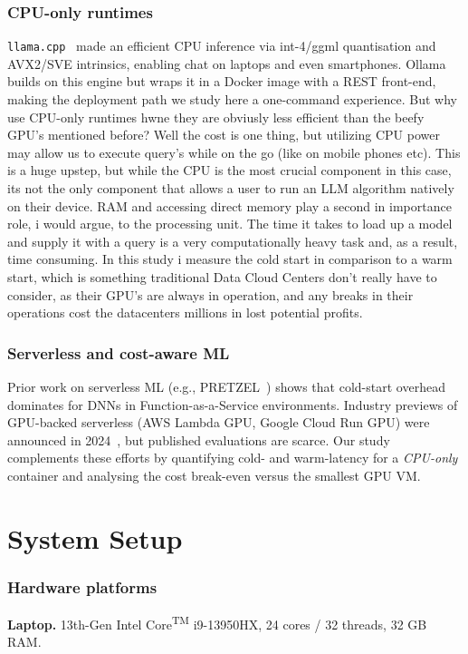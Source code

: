 \documentclass[conference]{IEEEtran}
\begin{document}
\subsubsection*{CPU-only runtimes}
\texttt{llama.cpp}~\cite{llamacpp} made an efficient CPU inference via int-4/ggml quantisation and AVX2/SVE intrinsics, enabling chat on laptops and even smartphones.
Ollama builds on this engine but wraps it in a Docker image with a REST front-end, making the deployment path we study here a one-command experience. But why use CPU-only runtimes hwne they are obviusly less efficient than the beefy GPU's mentioned before? Well the cost is one thing, but utilizing CPU power may allow us to execute query's while on the go (like on mobile phones etc). This is a huge upstep, but while the CPU is the most crucial component in this case, its not the only component that allows a user to run an LLM algorithm natively on their device. RAM and accessing direct memory play a second in importance role, i would argue, to the processing unit. The time it takes to load up a model and supply it with a query is a very computationally heavy task and, as a result, time consuming. In this study i measure the cold start in comparison to a warm start, which is something traditional Data Cloud Centers don't really have to consider, as their GPU's are always in operation, and any breaks in their operations cost the datacenters millions in lost potential profits.

\subsubsection*{Serverless and cost-aware ML}
Prior work on serverless ML (e.g., PRETZEL~\cite{pretzel}) shows that cold-start overhead dominates for DNNs in Function-as-a-Service environments.
Industry previews of GPU-backed serverless (AWS Lambda GPU, Google Cloud Run GPU) were announced in 2024~\cite{serverlessgpu}, but published evaluations are scarce.
Our study complements these efforts by quantifying cold- and warm-latency for a \emph{CPU-only} container and analysing the cost break-even versus the smallest GPU VM.
\section{System Setup}\label{sec:setup}

\subsubsection*{Hardware platforms}
\textbf{Laptop.} 13th-Gen Intel\textsuperscript{\textregistered} Core\textsuperscript{TM} i9-13950HX,  
24 cores / 32 threads, 32 GB RAM.
\end{document}
